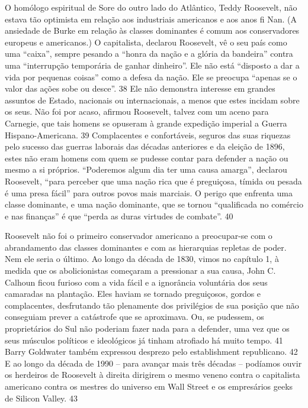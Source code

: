 O homólogo espiritual de Sore do outro lado do Atlântico, Teddy Roosevelt, não estava tão optimista em relação aos industriais americanos e aos anos fi Nan. (A ansiedade de Burke em relação às classes dominantes é comum aos conservadores europeus e americanos.) O capitalista, declarou Roosevelt, vê o seu país como uma “caixa”, sempre pesando a “honra da nação e a glória da bandeira” contra uma “interrupção temporária de ganhar dinheiro”. Ele não está “disposto a dar a vida por pequenas coisas” como a defesa da nação. Ele se preocupa “apenas se o valor das ações sobe ou desce”.
 {\color{blue} 38}  
Ele não demonstra interesse em grandes assuntos de Estado, nacionais ou internacionais, a menos que estes incidam sobre os seus. Não foi por acaso, afirmou Roosevelt, talvez com um aceno para Carnegie, que tais homens se opuseram à grande expedição imperial a Guerra Hispano-Americana.
 {\color{blue} 39}  
Complacentes e confortáveis, seguros das suas riquezas pelo sucesso das guerras laborais das décadas anteriores e da eleição de 1896, estes não eram homens com quem se pudesse contar para defender a nação ou mesmo a si próprios. “Poderemos algum dia ter uma causa amarga”, declarou Roosevelt, “para perceber que uma nação rica que é preguiçosa, tímida ou pesada é uma presa fácil” para outros povos mais marciais. O perigo que enfrenta uma classe dominante, e uma nação dominante, que se tornou “qualificada no comércio e nas finanças” é que “perda as duras virtudes de combate”.
 {\color{blue} 40}  

 
\par
 
Roosevelt não foi o primeiro conservador americano a preocupar-se com o abrandamento das classes dominantes e com as hierarquias repletas de poder. Nem ele seria o último. Ao longo da década de 1830, vimos no capítulo 1, à medida que os abolicionistas começaram a pressionar a sua causa, John C. Calhoun ficou furioso com a vida fácil e a ignorância voluntária dos seus camaradas na plantação. Eles haviam se tornado preguiçosos, gordos e complacentes, desfrutando tão plenamente dos privilégios de sua posição que não conseguiam prever a catástrofe que se aproximava. Ou, se pudessem, os proprietários do Sul não poderiam fazer nada para a defender, uma vez que os seus músculos políticos e ideológicos já tinham atrofiado há muito tempo.
 {\color{blue} 41}  
Barry Goldwater também expressou desprezo pelo establishment republicano.
 {\color{blue} 42}  
E ao longo da década de 1990 – para avançar mais três décadas – podíamos ouvir os herdeiros de Roosevelt à direita dirigirem o mesmo veneno contra o capitalista americano contra os mestres do universo em Wall Street e os empresários geeks de Silicon Valley.
 {\color{blue} 43}  

